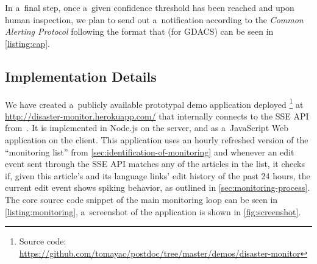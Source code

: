\documentclass[runningheads,a4paper]{llncs}
\begin{document}
In a~final step, once a~given confidence threshold has been reached
and upon human inspection, we plan to send out a~notification
according to the \emph{Common Alerting Protocol}
following the format that (for GDACS) can be seen in \autoref{listing:cap}.

\subsection{Implementation Details}

We have created a~publicly available prototypal demo application
deployed%
\footnote{Source code:
\url{https://github.com/tomayac/postdoc/tree/master/demos/disaster-monitor}}
at \url{http://disaster-monitor.herokuapp.com/}
that internally connects to the SSE API from~\cite{steiner2014bots}.
It is implemented in Node.js on the server,
and as a~JavaScript Web application on the client.
This application uses an hourly refreshed version of the ``monitoring list''
from \autoref{sec:identification-of-monitoring}
and whenever an edit event sent through the SSE API
matches any of the articles in the list,
it checks if, given this article's and its language links'
edit history of the past 24 hours,
the current edit event shows spiking behavior,
as outlined in \autoref{sec:monitoring-process}.
The core source code snippet of the main monitoring loop
can be seen in \autoref{listing:monitoring},
a~screenshot of the application is shown in \autoref{fig:screenshot}.
\end{document}
